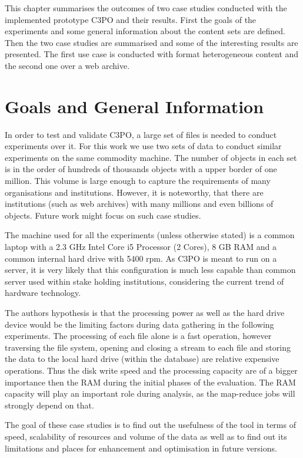 This chapter summarises the outcomes of two case studies conducted with the implemented prototype C3PO and their results.
First the goals of the experiments and some general information about the content sets are defined.
Then the two case studies are summarised and some of the interesting results are presented.
The first use case is conducted with format heterogeneous content and the second one over a web archive.

\section{Goals and General Information}
In order to test and validate C3PO, a large set of files is needed to conduct experiments over it.
For this work we use two sets of data to conduct similar experiments on the same commodity machine.
The number of objects in each set is in the order of hundreds of thousands objects with a upper border of one million.
This volume is large enough to capture the requirements of many organisations and institutions.
However, it is noteworthy, that there are institutions (such as web archives) with many millions and even billions of objects.
Future work might focus on such case studies.

The machine used for all the experiments (unless otherwise stated) is a common laptop with a 2.3 GHz Intel Core i5 Processor (2 Cores), 8 GB RAM and a common internal hard drive with 5400 rpm.
As C3PO is meant to run on a server, it is very likely that this configuration is much less capable than common server used within stake holding institutions, considering the current trend of hardware technology.

The authors hypothesis is that the processing power as well as the hard drive device would be the limiting factors during data gathering in the following experiments.
The  processing of each file alone is a fast operation, however traversing the file system, opening and closing a stream to each file and storing the data to the local hard drive (within the database) are relative expensive operations.
Thus the disk write speed and the processing capacity are of a bigger importance then the RAM during the initial phases of the evaluation.
The RAM capacity will play an important role during analysis, as the map-reduce jobs will strongly depend on that.

The goal of these case studies is to find out the usefulness of the tool in terms of speed, scalability of resources and volume of the data as well as to find out its limitations and places for enhancement and optimisation in future versions.

